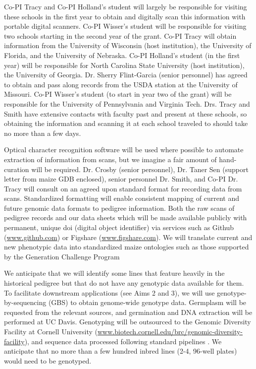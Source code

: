 \documentclass[12pt]{article}
\begin{document}
Co-PI Tracy and Co-PI Holland's student will largely be responsible for visiting these schools in the first year to obtain and digitally scan this information with portable digital scanners. 
Co-PI Wisser's student will be responsible for visiting two schools starting in the second year of the grant.
Co-PI  Tracy will obtain information from the University of Wisconsin (host institution), the University of Florida, and the University of Nebraska. 
Co-PI Holland's student (in the first year) will be responsible for North Carolina State University (host institution), the University of Georgia.
Dr. Sherry Flint-Garcia (senior personnel) has agreed to obtain and pass along records from the USDA station at the University of Missouri. 
Co-PI Wisser's student (to start in year two of the grant) will be responsible for the University of Pennsylvania and Virginia Tech.
Drs. Tracy and Smith have extensive contacts with faculty past and present at these schools, so obtaining the information and scanning it at each school traveled to should take no more than a few days. 

Optical character recognition software will be used where possible to automate extraction of information from scans, but we imagine a fair amount of hand-curation will be required.
Dr. Crosby (senior personnel), Dr. Taner Sen (support letter from maize GDB enclosed), senior personnel Dr.  Smith, and Co-PI Dr. Tracy will consult on an agreed upon standard format for recording data from scans.
Standardized formatting will enable consistent mapping of current and future genomic data formats to pedigree information. Both the raw scans of pedigree records and our data sheets which will be made available publicly with permanent, unique doi (digital object identifier) via services such as Github (\url{www.github.com}) or Figshare (\url{www.figshare.com}).
We will translate current and new phenotypic data into standardized maize ontologies such as those supported by the Generation Challenge Program \citep[\url{http://www.cropontology.org/ontology/CO_322/Maize}, ][]{shrestha2012bridging}

We anticipate that we will identify some lines that feature heavily in the historical pedigree but that do not have any genotypic data available for them. 
To facilitate downstream applications (see Aims 2 and 3), we will use genotype-by-sequencing (GBS) \citep{Elshire:2011ha} to obtain genome-wide genotype data.
Germplasm will be requested from the relevant sources, and germination and DNA extraction will be performed at UC Davis.  
Genotyping will be outsourced to the Genomic Diversity Facility at Cornell University (\small{\url{www.biotech.cornell.edu/brc/genomic-diversity-facility}}), and sequence data processed following standard pipelines \citep{Glaubitz:2014eu}.
We anticipate that no more than a few hundred inbred lines (2-4, 96-well plates) would need to be genotyped.
\end{document}
